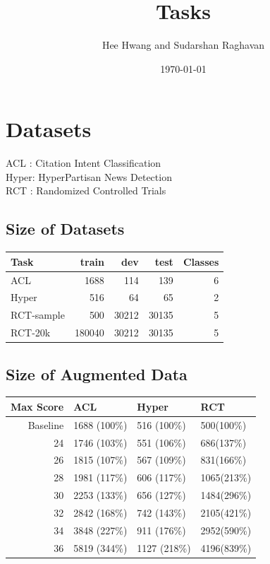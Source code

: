 \documentclass[twocolumn]{article}
\author{Hee Hwang and Sudarshan Raghavan}
\date{\today}
\title{Tasks}
\begin{document}
\maketitle



\section{Datasets}
\label{sec:orgfa400ad}
ACL  : Citation Intent Classification\\
Hyper: HyperPartisan News Detection\\
RCT  : Randomized Controlled Trials

\subsection{Size of Datasets}
\label{sec:org8936ea8}
\begin{center}
\begin{tabular}{lrrrr}
\hline
Task & train & dev & test & Classes\\
\hline
ACL & 1688 & 114 & 139 & 6\\
\hline
Hyper & 516 & 64 & 65 & 2\\
\hline
RCT-sample & 500 & 30212 & 30135 & 5\\
\hline
RCT-20k & 180040 & 30212 & 30135 & 5\\
\hline
\end{tabular}
\end{center}

\subsection{Size of Augmented Data}
\label{sec:orga98a931}
\begin{center}
\begin{tabular}{rlll}
\hline
Max Score & ACL & Hyper & RCT\\
\hline
Baseline & 1688 (100\%) & 516 (100\%) & 500(100\%)\\
\hline
24 & 1746 (103\%) & 551 (106\%) & 686(137\%)\\
\hline
26 & 1815 (107\%) & 567 (109\%) & 831(166\%)\\
\hline
28 & 1981 (117\%) & 606 (117\%) & 1065(213\%)\\
\hline
30 & 2253 (133\%) & 656 (127\%) & 1484(296\%)\\
\hline
32 & 2842 (168\%) & 742 (143\%) & 2105(421\%)\\
\hline
34 & 3848 (227\%) & 911 (176\%) & 2952(590\%)\\
\hline
36 & 5819 (344\%) & 1127 (218\%) & 4196(839\%)\\
\hline
\end{tabular}
\end{center}
\end{document}
